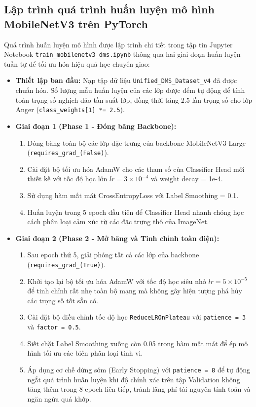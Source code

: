 \documentclass[../DoAn.tex]{subfiles}
\begin{document}
\subsection{Lập trình quá trình huấn luyện mô hình MobileNetV3 trên PyTorch}
Quá trình huấn luyện mô hình được lập trình chi tiết trong tập tin Jupyter Notebook \texttt{train\_mobilenetv3\_dms.ipynb} thông qua hai giai đoạn huấn luyện tuần tự để tối ưu hóa hiệu quả học chuyển giao:
\begin{itemize}
    \item \textbf{Thiết lập ban đầu:} Nạp tập dữ liệu \texttt{Unified\_DMS\_Dataset\_v4} đã được chuẩn hóa. Số lượng mẫu huấn luyện của các lớp được đếm tự động để tính toán trọng số nghịch đảo tần suất lớp, đồng thời tăng 2.5 lần trọng số cho lớp Anger (\texttt{class\_weights[1] *= 2.5}).
    \item \textbf{Giai đoạn 1 (Phase 1 - Đóng băng Backbone):}
    \begin{enumerate}
        \item Đóng băng toàn bộ các lớp đặc trưng của backbone MobileNetV3-Large (\texttt{requires\_grad\_(False)}).
        \item Cài đặt bộ tối ưu hóa AdamW cho các tham số của Classifier Head mới thiết kế với tốc độ học lớn $lr = 3 \times 10^{-4}$ và weight decay = 1e-4.
        \item Sử dụng hàm mất mát CrossEntropyLoss với Label Smoothing = 0.1.
        \item Huấn luyện trong 5 epoch đầu tiên để Classifier Head nhanh chóng học cách phân loại cảm xúc từ các đặc trưng thô của ImageNet.
    \end{enumerate}
    \item \textbf{Giai đoạn 2 (Phase 2 - Mở băng và Tinh chỉnh toàn diện):}
    \begin{enumerate}
        \item Sau epoch thứ 5, giải phóng tất cả các lớp của backbone (\texttt{requires\_grad\_(True)}).
        \item Khởi tạo lại bộ tối ưu hóa AdamW với tốc độ học siêu nhỏ $lr = 5 \times 10^{-5}$ để tinh chỉnh rất nhẹ toàn bộ mạng mà không gây hiện tượng phá hủy các trọng số tốt sẵn có.
        \item Cài đặt bộ điều chỉnh tốc độ học \texttt{ReduceLROnPlateau} với \texttt{patience = 3} và \texttt{factor = 0.5}.
        \item Siết chặt Label Smoothing xuống còn 0.05 trong hàm mất mát để ép mô hình tối ưu các biên phân loại tinh vi.
        \item Áp dụng cơ chế dừng sớm (Early Stopping) với \texttt{patience = 8} để tự động ngắt quá trình huấn luyện khi độ chính xác trên tập Validation không tăng thêm trong 8 epoch liên tiếp, tránh lãng phí tài nguyên tính toán và ngăn ngừa quá khớp.
    \end{enumerate}
\end{itemize}
\end{document}
